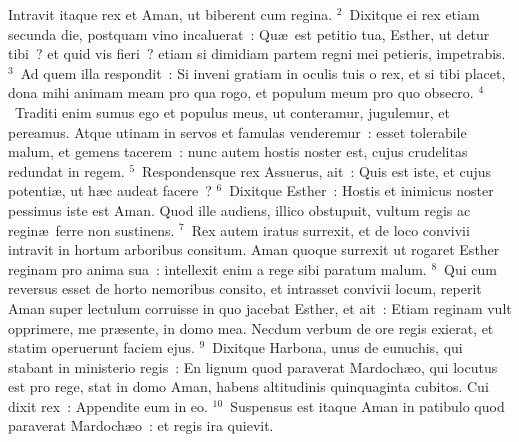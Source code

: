 \lettrine[lines=3,image=true,loversize=0.05,lraise=-0.03]{I}{}ntravit itaque rex et Aman, ut biberent cum regina.
${}^{2}$~Dixitque ei rex etiam secunda die, postquam vino incaluerat~: Qu\ae\ est petitio tua, Esther, ut detur tibi~? et quid vis fieri~? etiam si dimidiam partem regni mei petieris, impetrabis.
${}^{3}$~Ad quem illa respondit~: Si inveni gratiam in oculis tuis o rex, et si tibi placet, dona mihi animam meam pro qua rogo, et populum meum pro quo obsecro.
${}^{4}$~Traditi enim sumus ego et populus meus, ut conteramur, jugulemur, et pereamus. Atque utinam in servos et famulas venderemur~: esset tolerabile malum, et gemens tacerem~: nunc autem hostis noster est, cujus crudelitas redundat in regem.
${}^{5}$~Respondensque rex Assuerus, ait~: Quis est iste, et cujus potenti\ae , ut h\ae c audeat facere~?
${}^{6}$~Dixitque Esther~: Hostis et inimicus noster pessimus iste est Aman. Quod ille audiens, illico obstupuit, vultum regis ac regin\ae\ ferre non sustinens.
${}^{7}$~Rex autem iratus surrexit, et de loco convivii intravit in hortum arboribus consitum. Aman quoque surrexit ut rogaret Esther reginam pro anima sua~: intellexit enim a rege sibi paratum malum.
${}^{8}$~Qui cum reversus esset de horto nemoribus consito, et intrasset convivii locum, reperit Aman super lectulum corruisse in quo jacebat Esther, et ait~: Etiam reginam vult opprimere, me pr\ae sente, in domo mea. Necdum verbum de ore regis exierat, et statim operuerunt faciem ejus.
${}^{9}$~Dixitque Harbona, unus de eunuchis, qui stabant in ministerio regis~: En lignum quod paraverat Mardoch\ae o, qui locutus est pro rege, stat in domo Aman, habens altitudinis quinquaginta cubitos. Cui dixit rex~: Appendite eum in eo.
${}^{10}$~Suspensus est itaque Aman in patibulo quod paraverat Mardoch\ae o~: et regis ira quievit.

